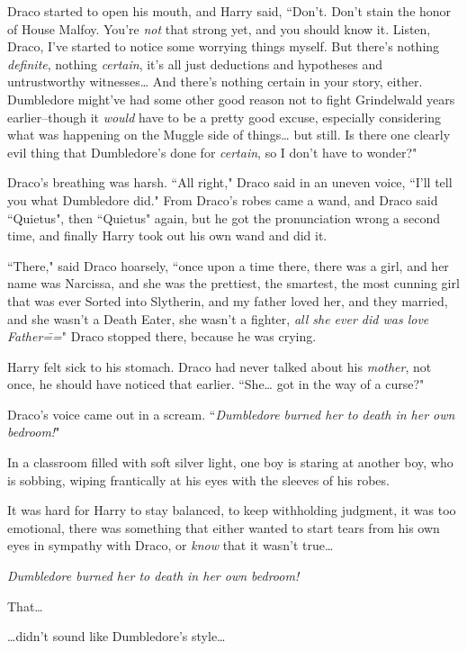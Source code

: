 Draco started to open his mouth, and Harry said, ``Don't. Don't stain the honor of House Malfoy. You're \emph{not} that strong yet, and you should know it. Listen, Draco, I've started to notice some worrying things myself. But there's nothing \emph{definite}, nothing \emph{certain}, it's all just deductions and hypotheses and untrustworthy witnesses{\ldots} And there's nothing certain in your story, either. Dumbledore might've had some other good reason not to fight Grindelwald years earlier\---though it \emph{would} have to be a pretty good excuse, especially considering what was happening on the Muggle side of things{\ldots} but still. Is there one clearly evil thing that Dumbledore's done for \emph{certain}, so I don't have to wonder?"

Draco's breathing was harsh. ``All right," Draco said in an uneven voice, ``I'll tell you what Dumbledore did." From Draco's robes came a wand, and Draco said ``Quietus", then ``Quietus" again, but he got the pronunciation wrong a second time, and finally Harry took out his own wand and did it.

``There," said Draco hoarsely, ``once upon a time there, there was a girl, and her name was Narcissa, and she was the prettiest, the smartest, the most cunning girl that was ever Sorted into Slytherin, and my father loved her, and they married, and she wasn't a Death Eater, she wasn't a fighter, \emph{all she ever did was love Father\===}" Draco stopped there, because he was crying.

Harry felt sick to his stomach. Draco had never talked about his \emph{mother}, not once, he should have noticed that earlier. ``She{\ldots} got in the way of a curse?"

Draco's voice came out in a scream. ``\emph{Dumbledore burned her to death in her own bedroom!}"

\later

In a classroom filled with soft silver light, one boy is staring at another boy, who is sobbing, wiping frantically at his eyes with the sleeves of his robes.

It was hard for Harry to stay balanced, to keep withholding judgment, it was too emotional, there was something that either wanted to start tears from his own eyes in sympathy with Draco, or \emph{know} that it wasn't true{\ldots}

\emph{Dumbledore burned her to death in her own bedroom!}

That{\ldots}

{\ldots}didn't sound like Dumbledore's style{\ldots}

